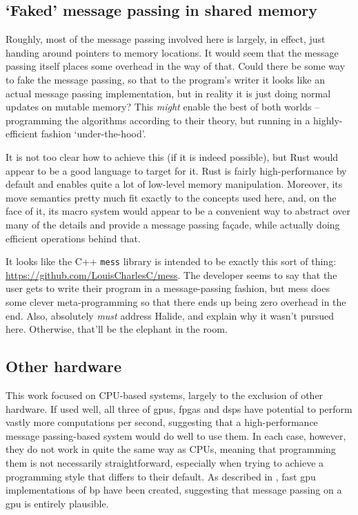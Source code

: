 \subsection{`Faked' message passing in shared memory}
Roughly, most of the message passing involved here is largely, in effect, just handing around pointers to memory locations.  It would seem that the message passing itself places some overhead in the way of that.  Could there be some way to fake the message passing, so that to the program's writer it looks like an actual message passing implementation, but in reality it is just doing normal updates on mutable memory?  This \emph{might} enable the best of both worlds -- programming the algorithms according to their theory, but running in a highly-efficient fashion `under-the-hood'.

It is not too clear how to achieve this (if it is indeed possible), but Rust would appear to be a good language to target for it.  Rust is fairly high-performance by default and enables quite a lot of low-level memory manipulation.  Moreover, its move semantics pretty much fit exactly to the concepts used here, and, on the face of it, its macro system would appear to be a convenient way to abstract over many of the details and provide a message passing façade, while actually doing efficient operations behind that.

It looks like the C++ \texttt{mess} library is intended to be exactly this sort of thing:  \url{https://github.com/LouisCharlesC/mess}.  The developer seems to say that the user gets to write their program in a message-passing fashion, but mess does some clever meta-programming so that there ends up being zero overhead in the end.  Also, absolutely \emph{must} address Halide, and explain why it wasn't pursued here.  Otherwise, that'll be the elephant in the room.

\subsection{Other hardware}
This work focused on CPU-based systems, largely to the exclusion of other hardware.  If used well, all three of \glspl{gpu}, \glspl{fpga} and \glspl{dsp} have potential to perform vastly more computations per second, suggesting that a high-performance message passing-based system would do well to use them.  In each case, however, they do not work in quite the same way as CPUs, meaning that programming them is not necessarily straightforward, especially when trying to achieve a programming style that differs to their default.  As described in , fast \gls{gpu} implementations of \gls{bp} have been created, suggesting that message passing on a \gls{gpu} is entirely plausible.

